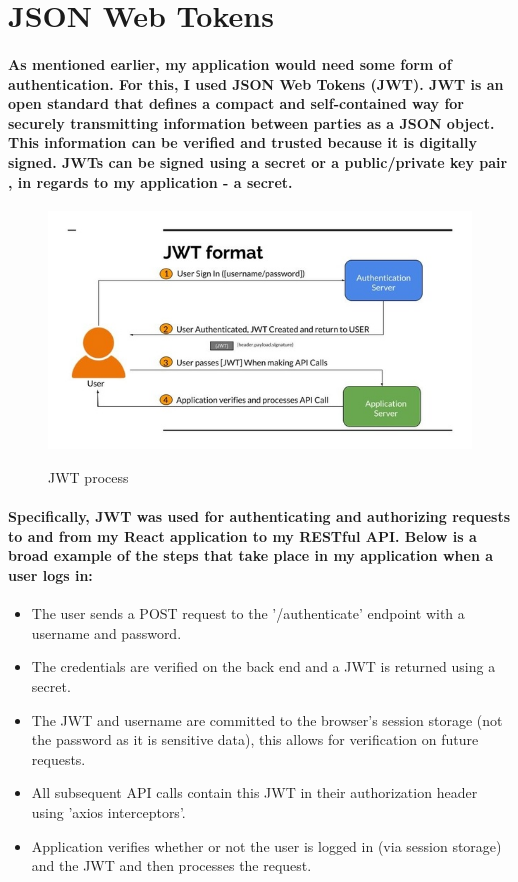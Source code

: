 \section{JSON Web Tokens}
\paragraph{As mentioned earlier, my application would need some form of authentication. For this, I used JSON Web Tokens (JWT). JWT is an open standard that defines a compact and self-contained way for securely transmitting information between parties as a JSON object. This information can be verified and trusted because it is digitally signed. JWTs can be signed using a secret or a public/private key pair \cite{JWT}, in regards to my application - a secret.}
\begin{figure}[ht]
    \centering
    \includegraphics[scale=0.4]{Images/jwt1.jpeg} 
    \label{jwt1_label}
    \caption{JWT process}
\end{figure}
\paragraph{Specifically, JWT was used for authenticating and authorizing requests to and from my React application to my RESTful API. Below is a broad example of the steps that take place in my application when a user logs in:}
\begin{itemize}
    \item The user sends a POST request to the '/authenticate' endpoint with a username and password. 
    \item The credentials are verified on the back end and a JWT is returned using a secret.
    \item The JWT and username are committed to the browser's session storage (not the password as it is sensitive data), this allows for verification on future requests.
    \item All subsequent API calls contain this JWT in their  authorization header using 'axios interceptors'.
    \item Application verifies whether or not the user is logged in (via session storage) and the JWT and then processes the request.
\end{itemize} 


